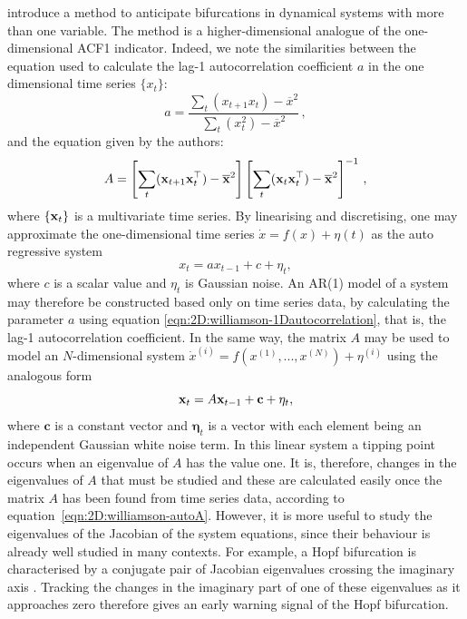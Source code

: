 \citet{williamson2015} introduce a method to anticipate bifurcations in dynamical systems with more than one variable. The method is a higher-dimensional analogue of the one-dimensional ACF1 indicator. Indeed, we note the similarities between the equation used to calculate the lag-1 autocorrelation coefficient $a$ in the one dimensional time series $\{x_t\}$:
\begin{equation}
	a = \frac{   \sum_t (x_{t+1}x_t)   - \overline{x}^2}{\sum_t (x_t^2) - \overline{x}^2}\,,
	\label{eqn:2D:williamson-1Dautocorrelation}
\end{equation}
and the equation given by the authors:
\begin{equation}
	A = \left[\sum_t (\mathbf{x}_{t+1}\mathbf{x}_t^\top)   - \overline{\mathbf{x}}^2\right]\left[\sum_t (\mathbf{x}_t\mathbf{x}_t^\top) - \overline{\mathbf{x}}^2\right]^{-1}\,,
	\label{eqn:2D:williamson-autoA}
\end{equation}
where $\{\mathbf{x}_t\}$ is a multivariate time series. By linearising and discretising, one may approximate the one-dimensional time series $\dot{x} = f(x) + \eta(t)$ as the auto regressive system
\begin{equation}
x_t = ax_{t-1} + c + \eta_t,
\label{eqn:2D:williamson-AR1equation}
\end{equation}
where $c$ is a scalar value and $\eta_t$ is Gaussian noise. An AR(1) model of a system may therefore be constructed based only on time series data, by calculating the parameter $a$ using equation \ref{eqn:2D:williamson-1Dautocorrelation}, that is, the lag-1 autocorrelation coefficient. In the same way, the matrix $A$ may be used to model an $N$-dimensional system $\dot{x}^{(i)} = f(x^{(1)},...,x^{(N)})+\eta^{(i)}$ using the analogous form
\begin{equation}
\mathbf{x}_t = A\mathbf{x}_{t-1} + \mathbf{c} + \mathbf{\eta}_t,
\label{eqn:2D:williamson-AR1analogue}
\end{equation}
where $\mathbf{c}$ is a constant vector and $\mathbf{\eta}_t$ is a vector with each element being an independent Gaussian white noise term. In this linear system a tipping point occurs when an eigenvalue of $A$ has the value one. It is, therefore, changes in the eigenvalues of $A$ that must be studied and these are calculated easily once the matrix $A$ has been found from time series data, according to equation~\ref{eqn:2D:williamson-autoA}. However, it is more useful to study the eigenvalues of the Jacobian of the system equations, since their behaviour is already well studied in many contexts. For example, a Hopf bifurcation is characterised by a conjugate pair of Jacobian eigenvalues crossing the imaginary axis \citep{strogatz2014}. Tracking the changes in the imaginary part of one of these eigenvalues as it approaches zero therefore gives an early warning signal of the Hopf bifurcation. 

